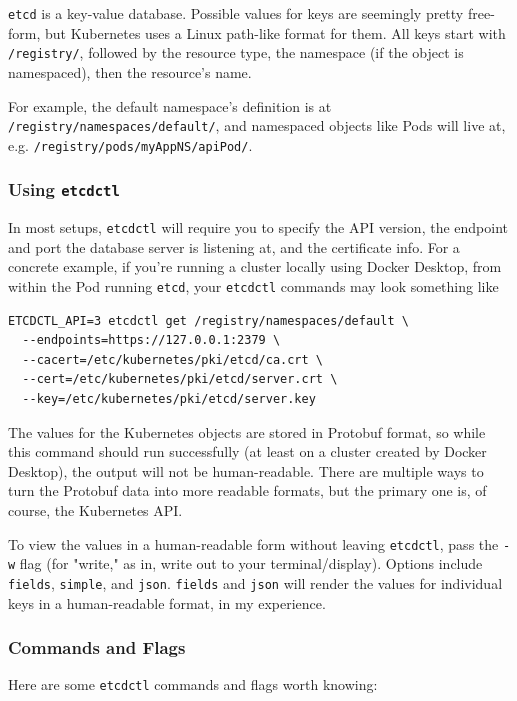 \documentclass[11pt, a4paper]{article}
\begin{document}
\texttt{etcd} is a key-value database. Possible values for keys are seemingly pretty free-form, but Kubernetes uses a Linux path-like format for them. All keys start with \texttt{/registry/}, followed by the resource type, the namespace (if the object is namespaced), then the resource's name.

For example, the default namespace's definition is at \texttt{/registry/namespaces/default/}, and namespaced objects like Pods will live at, e.g. \texttt{/registry/pods/myAppNS/apiPod/}.

\subsubsection{Using \texttt{etcdctl}}

In most setups, \texttt{etcdctl} will require you to specify the API version, the endpoint and port the database server is listening at, and the certificate info. For a concrete example, if you're running a cluster locally using Docker Desktop, from within the Pod running \texttt{etcd}, your \texttt{etcdctl} commands may look something like

\begin{lstlisting}
ETCDCTL_API=3 etcdctl get /registry/namespaces/default \
  --endpoints=https://127.0.0.1:2379 \
  --cacert=/etc/kubernetes/pki/etcd/ca.crt \
  --cert=/etc/kubernetes/pki/etcd/server.crt \
  --key=/etc/kubernetes/pki/etcd/server.key
\end{lstlisting}

The values for the Kubernetes objects are stored in Protobuf format, so while this command should run successfully (at least on a cluster created by Docker Desktop), the output will not be human-readable. There are multiple ways to turn the Protobuf data into more readable formats, but the primary one is, of course, the Kubernetes API. 

To view the values in a human-readable form without leaving \texttt{etcdctl}, pass the \texttt{-w} flag (for "write," as in, write out to your terminal/display). Options include \texttt{fields}, \texttt{simple}, and \texttt{json}. \texttt{fields} and \texttt{json} will render the values for individual keys in a human-readable format, in my experience.

\subsubsection{Commands and Flags}
Here are some \texttt{etcdctl} commands and flags worth knowing:
\end{document}
